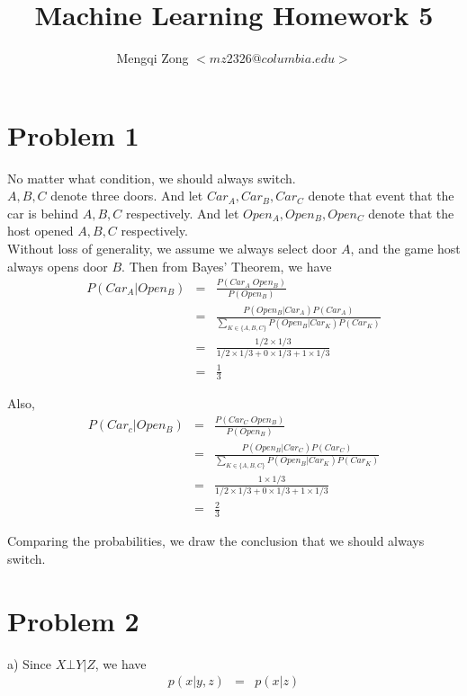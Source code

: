 \documentclass[12pt]{article}
\title{Machine Learning Homework 5}
\author{Mengqi Zong $<mz2326@columbia.edu>$}
\begin{document}
\maketitle

\setlength{\parindent}{0in}

\section*{Problem 1}

No matter what condition, we should always switch. \\

$A, B, C$ denote three doors. And let $Car_A, Car_B, Car_C$ denote that event that the car is behind $A, B, C$ respectively. And let $Open_A, Open_B, Open_C$ denote that the host opened $A, B, C$ respectively. \\

Without loss of generality, we assume we always select door $A$, and the game host always opens door $B$. Then from Bayes' Theorem, we have
\begin{eqnarray*}
  P(Car_A | Open_B)
  &=& \frac {P(Car_A \; Open_B)}{P(Open_B)} \\
  &=& \frac {P(Open_B | Car_A) P(Car_A)}
  {\sum_{K \in \{A,B,C\}} P(Open_B | Car_K) P(Car_K)} \\
  &=& \frac {1/2 \times 1/3}{1/2 \times 1/3 + 0 \times 1/3 + 1 \times 1/3} \\
  &=& \frac {1}{3}
\end{eqnarray*}

Also,
\begin{eqnarray*}
  P(Car_c | Open_B)
  &=& \frac {P(Car_C \; Open_B)}{P(Open_B)} \\
  &=& \frac {P(Open_B | Car_C) P(Car_C)}
  {\sum_{K \in \{A,B,C\}} P(Open_B | Car_K) P(Car_K)} \\
  &=& \frac {1 \times 1/3}{1/2 \times 1/3 + 0 \times 1/3 + 1 \times 1/3} \\
  &=& \frac {2}{3}
\end{eqnarray*}

Comparing the probabilities, we draw the conclusion that we should always switch.

\section*{Problem 2}

a) Since $X \bot Y | Z$, we have
\begin{eqnarray*}
  p(x|y,z) &=& p(x|z)
\end{eqnarray*}
\end{document}
